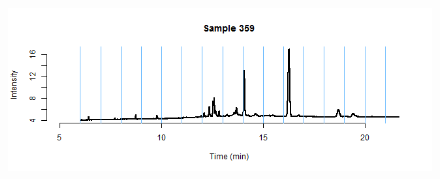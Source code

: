 \documentclass[11pt]{article}
\theoremstyle{plain}
\theoremstyle{definition}
\begin{document}
\begin{figure}[H]
\begin{center}
\includegraphics[trim ={3.5cm 2.7cm 2cm 2cm},scale=.6, clip=true]{BinPlotDMC_34.png}
\end{center}
\end{figure}
\end{document}
